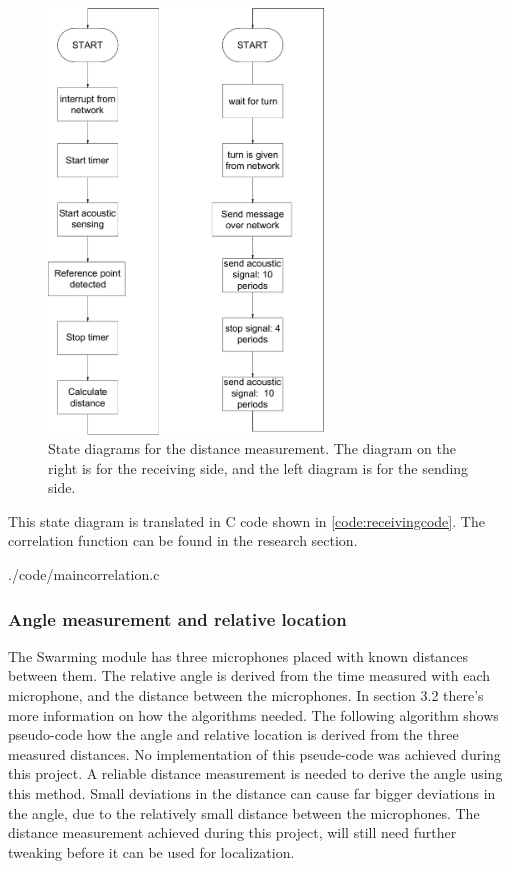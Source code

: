 \documentclass[10pt,a4paper]{article}
\begin{document}
\begin{figure}[H]
    \centering
    \includegraphics[width=0.65\textwidth]{distancem.pdf}
    \caption{State diagrams for the distance measurement. The diagram on the right is for the receiving side, and the left diagram is for the sending side.}
    \label{fig:distancemk}
\end{figure}

This state diagram is translated in C code shown in \ref{code:receivingcode}. The correlation function can be found in the research section.

 
{./code/maincorrelation.c}


\subsubsection{Angle measurement and relative location}
The Swarming module has three microphones placed with known distances between them. The relative angle is derived from the time measured with each microphone, and the distance between the microphones. In section 3.2 there's more information on how the algorithms needed. The following algorithm shows pseudo-code how the angle and relative location is derived from the three measured distances.
No implementation of this pseude-code was achieved during this project. A reliable distance measurement is needed to derive the angle using this method. Small deviations in the distance can cause far bigger deviations in the angle, due to the relatively small distance between the microphones.
The distance measurement achieved during this project, will still need further tweaking before it can be used for localization.

\end{document}
